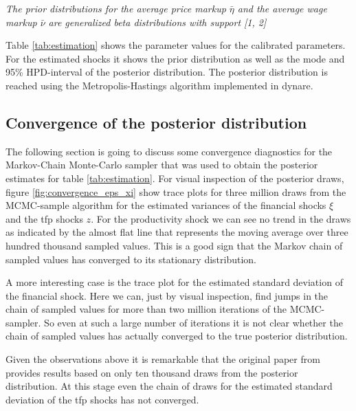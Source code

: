 \begin{table}
  \centering
  \caption{Parameterization}
  \label{tab:estimation}
  \smallskip

  \raggedright
  {\footnotesize \textit{The prior distributions for the average price
    markup $\bar{\eta}$ and the average wage markup $\bar{\nu}$ are generalized
    beta distributions with support [1, 2] }}
\end{table}

Table \ref{tab:estimation} shows the parameter values for the calibrated
parameters. For the estimated shocks it shows the prior distribution as well as
the mode and 95\% HPD-interval of the posterior distribution. The posterior
distribution is reached using the Metropolis-Hastings algorithm implemented in dynare.

\subsection{Convergence of the posterior distribution}
\label{sec:convergence}

The following section is going to discuss some convergence diagnostics for the
Markov-Chain Monte-Carlo sampler that was used to obtain the posterior
estimates for table \ref{tab:estimation}. For visual inspection of the
posterior draws, figure \ref{fig:convergence_eps_xi} show trace plots for three
million draws from the MCMC-sample algorithm for the estimated variances of the
financial shocks \(\xi\) and the tfp shocks \(z\). For the productivity shock
we can see no trend in the draws as indicated by the almost flat line that
represents the moving average over three hundred thousand sampled values. This
is a good sign that the Markov chain of sampled values has converged to its
stationary distribution.

A more interesting case is the trace plot for the estimated standard deviation
of the financial shock. Here we can, just by visual inspection, find jumps in
the chain of sampled values for more than two million iterations of the
MCMC-sampler. So even at such a large number of iterations it is not clear
whether the chain of sampled values has actually converged to the true
posterior distribution. 

Given the observations above it is remarkable that the original paper from
\textcite{jerman_macroeconomic_2012} provides results based on only ten
thousand draws from the posterior distribution. At this stage even the chain of
draws for the estimated standard deviation of the tfp shocks has not converged.
